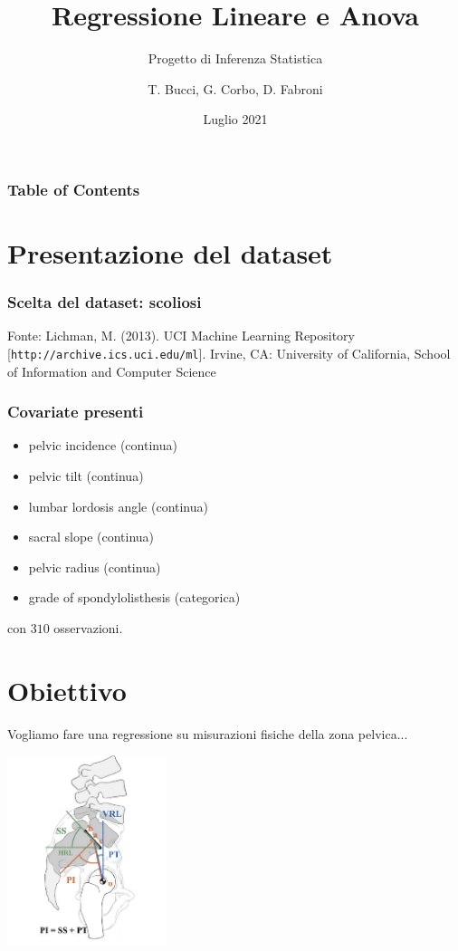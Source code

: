 \documentclass{beamer}
\title{Regressione Lineare e Anova}
\subtitle{Progetto di Inferenza Statistica}
\author{T. Bucci, G. Corbo, D. Fabroni}
\institute{Politecnico di Milano}
\date{Luglio 2021}
\begin{document}
\frame{\titlepage}

\begin{frame}
    \frametitle{Table of Contents}
    \tableofcontents
\end{frame}

\section{Presentazione del dataset}
\begin{frame}
    \frametitle{Scelta del dataset: scoliosi}
    Fonte: Lichman, M. (2013). UCI Machine Learning Repository [\texttt{http://archive.ics.uci.edu/ml}]. Irvine, CA: University of California, School of Information and Computer Science
\end{frame}


\begin{frame}
    \frametitle{Covariate presenti}
    \begin{itemize}
        \item pelvic incidence (continua)
        \item pelvic tilt (continua)
        \item lumbar lordosis angle (continua)
        \item sacral slope (continua)
        \item pelvic radius (continua)
        \item grade of spondylolisthesis (categorica)
    \end{itemize}
    con $310$ osservazioni.
\end{frame}


\section{Obiettivo}
\begin{frame}
    Vogliamo fare una regressione su misurazioni fisiche della zona pelvica...
    \begin{center}
        \includegraphics[width=0.35\textwidth]{bacino.png}
    \end{center}
\end{frame}
\end{document}
